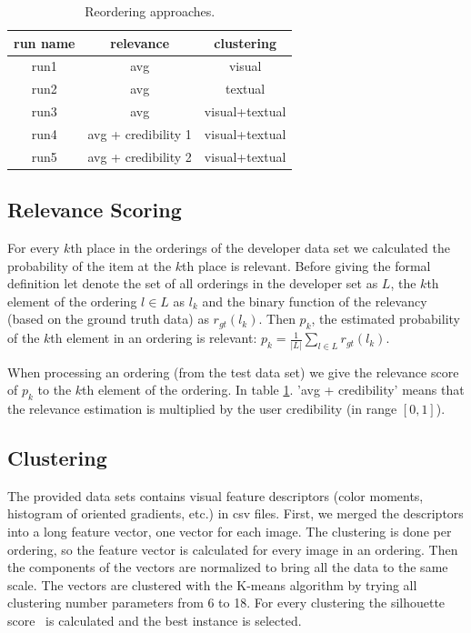 \documentclass{acm_proc_article-me}
\begin{document}
\begin{table}[h]
\centering
\begin{tabular}{|c|c|c|}
	\hline 
	run name & relevance & clustering\tabularnewline
	\hline 
	\hline 
	run1 & avg & visual\tabularnewline
	\hline 
	run2 & avg & textual\tabularnewline
	\hline 
	run3 & avg & visual+textual\tabularnewline
	\hline 
	run4 & avg + credibility 1 & visual+textual\tabularnewline
	\hline 
	run5 & avg + credibility 2 & visual+textual\tabularnewline
	\hline 
\end{tabular}
\caption{Reordering approaches.}
\label{table:runs}
\end{table}

\subsection{Relevance Scoring}
\label{sec:relevance}

For every $k$th place in the orderings of the developer data set we calculated the probability of the item at the $k$th place is relevant. Before giving the formal definition let denote the set of all orderings in the developer set as $L$, the $k$th element of the ordering $l \in L$ as $l_k$ and the binary function of the relevancy (based on the ground truth data) as $r_{gt}(l_k)$. Then $p_k$, the estimated probability of the $k$th element in an ordering is relevant:
$p_k = \frac{1}{|L|}\sum_{l \in L}r_{gt}(l_k)$.

When processing an ordering (from the test data set) we give the relevance score of $p_k$ to the $k$th element of the ordering. In table \ref{table:runs}. 'avg + credibility' means that the relevance estimation is multiplied by the user credibility (in range $[0,1]$). 

\subsection{Clustering}
\label{sec:clust}

The provided data sets contains visual feature descriptors (color moments, histogram of oriented gradients, etc.) in csv files. First, we merged the descriptors into a long feature vector, one vector for each image. The clustering is done per ordering, so the feature vector is calculated for every image in an ordering. Then the components of the vectors are normalized to bring all the data to the same scale. The vectors are clustered with the K-means algorithm by trying all clustering number parameters from 6 to 18. For every clustering the silhouette score~\cite{rousseeuw1987silhouettes} is calculated and the best instance is selected.
\end{document}
